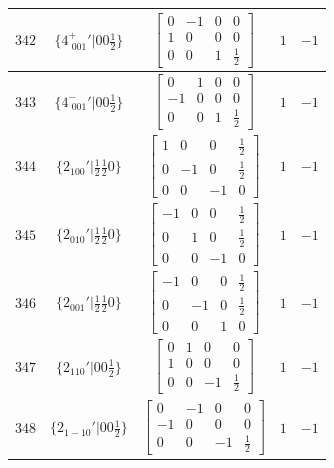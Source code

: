 \documentclass[fleqn,8pt]{jsarticle}
\begin{document}
\begin{longtable}{ccccc}
$ 342 $ & $ \{4^{+}_{\,\,001}{}'|0 0 \frac{1}{2}\} $ & $ \begin{bmatrix} 0 & -1 & 0 & 0 \\ 1 & 0 & 0 & 0 \\ 0 & 0 & 1 & \frac{1}{2} \end{bmatrix} $ & $ 1 $ & $ -1 $ \\ \hline
$ 343 $ & $ \{4^{-}_{\,\,001}{}'|0 0 \frac{1}{2}\} $ & $ \begin{bmatrix} 0 & 1 & 0 & 0 \\ -1 & 0 & 0 & 0 \\ 0 & 0 & 1 & \frac{1}{2} \end{bmatrix} $ & $ 1 $ & $ -1 $ \\ \hline
$ 344 $ & $ \{2{}_{100}{}'|\frac{1}{2} \frac{1}{2} 0\} $ & $ \begin{bmatrix} 1 & 0 & 0 & \frac{1}{2} \\ 0 & -1 & 0 & \frac{1}{2} \\ 0 & 0 & -1 & 0 \end{bmatrix} $ & $ 1 $ & $ -1 $ \\ \hline
$ 345 $ & $ \{2{}_{010}{}'|\frac{1}{2} \frac{1}{2} 0\} $ & $ \begin{bmatrix} -1 & 0 & 0 & \frac{1}{2} \\ 0 & 1 & 0 & \frac{1}{2} \\ 0 & 0 & -1 & 0 \end{bmatrix} $ & $ 1 $ & $ -1 $ \\ \hline
$ 346 $ & $ \{2{}_{001}{}'|\frac{1}{2} \frac{1}{2} 0\} $ & $ \begin{bmatrix} -1 & 0 & 0 & \frac{1}{2} \\ 0 & -1 & 0 & \frac{1}{2} \\ 0 & 0 & 1 & 0 \end{bmatrix} $ & $ 1 $ & $ -1 $ \\ \hline
$ 347 $ & $ \{2{}_{110}{}'|0 0 \frac{1}{2}\} $ & $ \begin{bmatrix} 0 & 1 & 0 & 0 \\ 1 & 0 & 0 & 0 \\ 0 & 0 & -1 & \frac{1}{2} \end{bmatrix} $ & $ 1 $ & $ -1 $ \\ \hline
$ 348 $ & $ \{2{}_{1-10}{}'|0 0 \frac{1}{2}\} $ & $ \begin{bmatrix} 0 & -1 & 0 & 0 \\ -1 & 0 & 0 & 0 \\ 0 & 0 & -1 & \frac{1}{2} \end{bmatrix} $ & $ 1 $ & $ -1 $ \\ \hline

\end{longtable}
\end{document}
